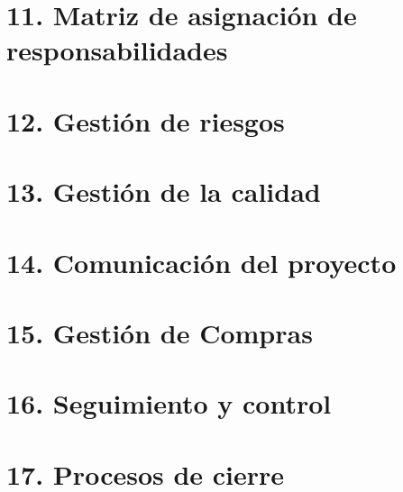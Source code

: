\documentclass[11pt]{charter}
\begin{document}
\section{11. Matriz de asignación de responsabilidades}
\section{12. Gestión de riesgos}
\section{13. Gestión de la calidad}
\section{14. Comunicación del proyecto}
\section{15. Gestión de Compras}
\section{16. Seguimiento y control}
\section{17. Procesos de cierre}    

%
\end{document}
